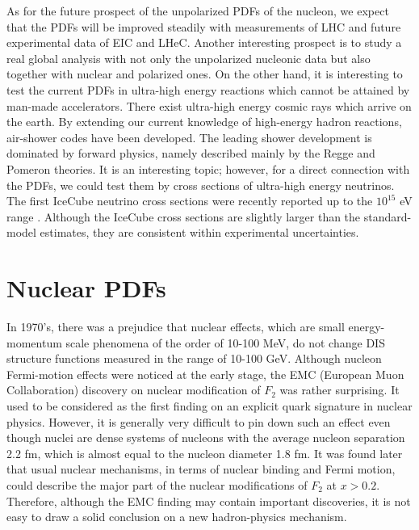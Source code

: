 \documentclass{PoS}
\begin{document}
As for the future prospect of the unpolarized PDFs of the nucleon,
we expect that the PDFs will be improved steadily with measurements 
of LHC and future experimental data of EIC and LHeC. 
Another interesting prospect is to study a real global analysis
with not only the unpolarized nucleonic data but also together with 
nuclear and polarized ones.
On the other hand, it is interesting to test the current PDFs
in ultra-high energy reactions which cannot be attained by man-made accelerators.
There exist ultra-high energy cosmic rays which arrive on the earth.
By extending our current knowledge of high-energy hadron reactions,
air-shower codes have been developed. The leading shower 
development is dominated by forward physics, namely described mainly
by the Regge and Pomeron theories. It is an interesting topic; however,
for a direct connection with the PDFs, we could test them by cross sections
of ultra-high energy neutrinos. The first IceCube neutrino cross sections
were recently reported up to the $10^{15}$ eV range \cite{icecube-2017}. 
Although the IceCube cross sections are slightly larger than 
the standard-model estimates, they are consistent within 
experimental uncertainties.

\section{Nuclear PDFs}
\label{nuclear-pdfs}

In 1970's, there was a prejudice that nuclear effects, which are
small energy-momentum scale phenomena of the order of 10-100 MeV, do not change
DIS structure functions measured in the range of 10-100 GeV.
Although nucleon Fermi-motion effects were noticed at the early stage, 
the EMC (European Muon Collaboration) discovery on
nuclear modification of $F_2$ was rather surprising.
It used to be considered as the first finding on an explicit quark
signature in nuclear physics. However, it is generally very difficult to 
pin down such an effect even though nuclei are dense systems of nucleons
with the average nucleon separation 2.2 fm, which is almost equal to
the nucleon diameter 1.8 fm.
It was found later that usual nuclear mechanisms,
in terms of nuclear binding and Fermi motion, could describe
the major part of the nuclear modifications of $F_2$ at $x>0.2$.
Therefore, although the EMC finding may contain important discoveries,
it is not easy to draw a solid conclusion on a new hadron-physics
mechanism.
\end{document}
